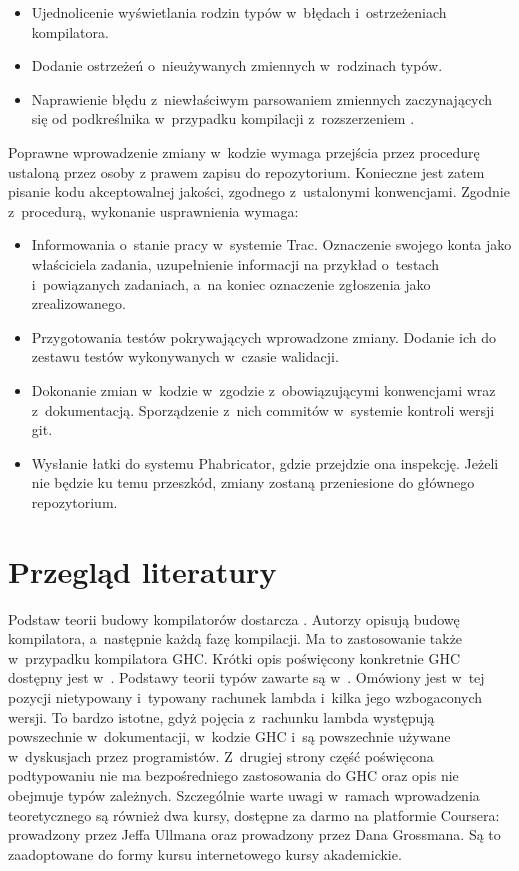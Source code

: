 \begin{itemize}
 \item Ujednolicenie wyświetlania rodzin typów w~błędach i~ostrzeżeniach kompilatora.
 \item Dodanie ostrzeżeń o~nieużywanych zmiennych w~rodzinach typów.
 \item Naprawienie błędu z~niewłaściwym parsowaniem zmiennych zaczynających się od podkreślnika w~przypadku kompilacji z~rozszerzeniem .
\end{itemize}

Poprawne wprowadzenie zmiany w~kodzie wymaga przejścia przez procedurę ustaloną
przez osoby z prawem zapisu do repozytorium\cite{WikiFixingBugs}. Konieczne
jest zatem pisanie kodu akceptowalnej jakości, zgodnego z~ustalonymi konwencjami.
Zgodnie z~procedurą, wykonanie usprawnienia wymaga:

\begin{itemize}
  \item Informowania o~stanie pracy w~systemie Trac. Oznaczenie swojego konta jako właściciela zadania, uzupełnienie informacji na przykład o~testach i~powiązanych zadaniach, a~na koniec oznaczenie zgłoszenia jako zrealizowanego.
  \item Przygotowania testów pokrywających wprowadzone zmiany. Dodanie ich do zestawu testów wykonywanych w~czasie walidacji.
  \item Dokonanie zmian w~kodzie w~zgodzie z~obowiązującymi konwencjami wraz z~dokumentacją. Sporządzenie z~nich commitów w~systemie kontroli wersji git.
  \item Wysłanie łatki do systemu Phabricator, gdzie przejdzie ona inspekcję. Jeżeli nie będzie ku temu przeszkód, zmiany zostaną przeniesione do głównego repozytorium.
\end{itemize}

\section{Przegląd literatury}\label{sec:przeglad_literatury}

Podstaw teorii budowy kompilatorów dostarcza \cite{Dragon}. Autorzy opisują
budowę kompilatora, a~następnie każdą fazę kompilacji. Ma to zastosowanie także
w~przypadku kompilatora GHC. Krótki opis poświęcony konkretnie GHC dostępny jest
w~\cite{AOSA}. Podstawy teorii typów zawarte są w~\cite{TAPL}. Omówiony jest
w~tej pozycji nietypowany i~typowany rachunek lambda i~kilka jego wzbogaconych
wersji. To bardzo istotne, gdyż pojęcia z~rachunku lambda występują powszechnie
w~dokumentacji, w~kodzie GHC i~są powszechnie używane w~dyskusjach przez
programistów. Z~drugiej strony część poświęcona podtypowaniu nie ma
bezpośredniego zastosowania do GHC oraz opis nie obejmuje typów
zależnych. Szczególnie warte uwagi w~ramach wprowadzenia teoretycznego są
również dwa kursy, dostępne za darmo na platformie Coursera: 
prowadzony przez Jeffa Ullmana oraz  prowadzony
przez Dana Grossmana. Są to zaadoptowane do formy kursu internetowego kursy
akademickie.

